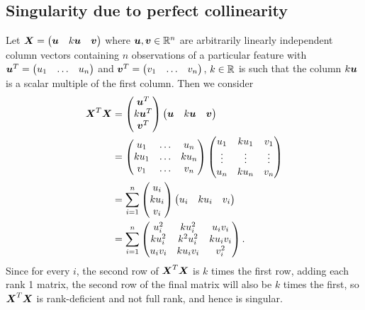 \documentclass[12pt]{article}
\begin{document}
	\subsection{Singularity due to perfect collinearity \label{sec:append1}}
	Let $\boldsymbol{X}=\begin{pmatrix}
		\boldsymbol{u} & k\boldsymbol{u} & \boldsymbol{v}
	\end{pmatrix}$ where $\bmu,\bmv\in\Rn$ are arbitrarily linearly independent column vectors containing $n$ observations of a particular feature with $\boldsymbol{u}^T=\begin{pmatrix}
		u_1 & \ldots & u_n
	\end{pmatrix}$ and $\boldsymbol{v}^T=\begin{pmatrix}
		v_1 & \ldots & v_n
	\end{pmatrix}$, $k\in\RR$ is such that the column $k\boldsymbol{u}$ is a scalar multiple of the first column. Then we consider
	\begin{align*}
		\boldsymbol{X}^T\boldsymbol{X}&=\begin{pmatrix}
			\boldsymbol{u}^T \\ k\boldsymbol{u}^T \\ \boldsymbol{v}^T
		\end{pmatrix}\begin{pmatrix}
			\boldsymbol{u} & k\boldsymbol{u} & \boldsymbol{v}
		\end{pmatrix}\\
		&=\begin{pmatrix}
			u_1 & \ldots & u_n \\ ku_1 & \ldots & ku_n \\ v_1 & \ldots & v_n
		\end{pmatrix}\begin{pmatrix}
			u_1 & ku_1 & v_1 \\ \vdots & \vdots & \vdots \\ u_n & ku_n & v_n
		\end{pmatrix}\\
		&=\sum_{i=1}^{n}\begin{pmatrix}
			u_i \\ ku_i \\ v_i
		\end{pmatrix}\begin{pmatrix}
			u_i & ku_i & v_i
		\end{pmatrix}\\
		&=\sum_{i=1}^{n}\begin{pmatrix}
			u_i^2 & ku_i^2 & u_iv_i \\ 
			ku_i^2 & k^2u_i^2 & ku_iv_i \\
			u_iv_i & ku_iv_i & v_i^2
		\end{pmatrix}.
	\end{align*}
	Since for every $i$, the second row of $\boldsymbol{X}^T\boldsymbol{X}$ is $k$ times the first row, adding each rank 1 matrix, the second row of the final matrix will also be $k$ times the first, so $\boldsymbol{X}^T\boldsymbol{X}$ is rank-deficient and not full rank, and hence is singular. \\
	
\end{document}
